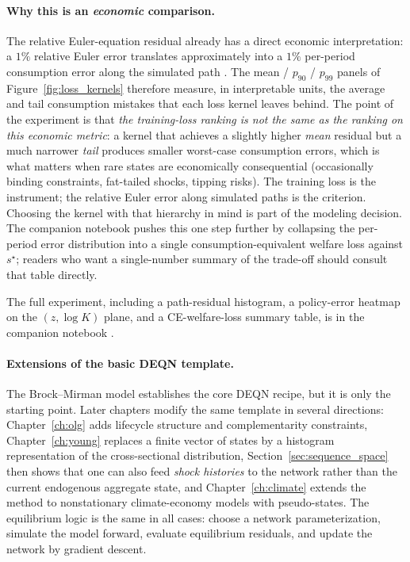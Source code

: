 \documentclass[11pt,a4paper]{report}
\begin{document}
\paragraph{Why this is an \emph{economic} comparison.}  The relative Euler-equation residual already has a direct economic interpretation: a $1\%$ relative Euler error translates approximately into a $1\%$ per-period consumption error along the simulated path \citep[\S4.2]{judd1998numerical}.  The mean / $p_{90}$ / $p_{99}$ panels of Figure~\ref{fig:loss_kernels} therefore measure, in interpretable units, the average and tail consumption mistakes that each loss kernel leaves behind.  The point of the experiment is that \emph{the training-loss ranking is not the same as the ranking on this economic metric}: a kernel that achieves a slightly higher \emph{mean} residual but a much narrower \emph{tail} produces smaller worst-case consumption errors, which is what matters when rare states are economically consequential (occasionally binding constraints, fat-tailed shocks, tipping risks).  The training loss is the instrument; the relative Euler error along simulated paths is the criterion.  Choosing the kernel with that hierarchy in mind is part of the modeling decision.  The companion notebook pushes this one step further by collapsing the per-period error distribution into a single consumption-equivalent welfare loss against $s^\star$; readers who want a single-number summary of the trade-off should consult that table directly.

The full experiment, including a path-residual histogram, a policy-error heatmap on the $(z, \log K)$ plane, and a CE-welfare-loss summary table, is in the companion notebook .

\paragraph{Extensions of the basic DEQN template.}
The Brock--Mirman model establishes the core DEQN recipe, but it is only the starting point.  Later chapters modify the same template in several directions: Chapter~\ref{ch:olg} adds lifecycle structure and complementarity constraints, Chapter~\ref{ch:young} replaces a finite vector of states by a histogram representation of the cross-sectional distribution, Section~\ref{sec:sequence_space} then shows that one can also feed \emph{shock histories} to the network rather than the current endogenous aggregate state, and Chapter~\ref{ch:climate} extends the method to nonstationary climate-economy models with pseudo-states.  The equilibrium logic is the same in all cases: choose a network parameterization, simulate the model forward, evaluate equilibrium residuals, and update the network by gradient descent.
\end{document}
